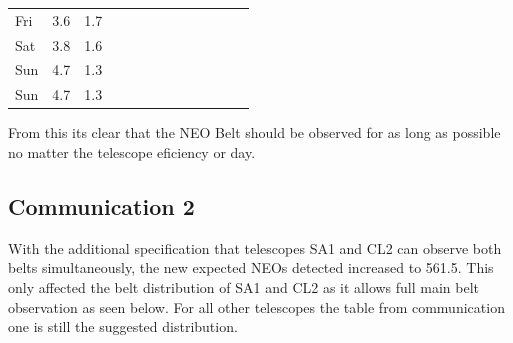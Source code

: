 \documentclass{article}
\begin{document}
\begin{table}[h]
\begin{tabular}{lcccccccccccc}
		{ Fri}                                  & { 3.6}                                  & { 1.7}                                   & { }                         &                                                 & { }                         &                                                 & { }                            &                         & { }                         &                      & { }                         &                      \\
		{ Sat}                                  & { 3.8}                                  & { 1.6}                                   & { }                         &                                                 & { }                         &                                                 & { }                            &                         & { }                         &                      & { }                         &                      \\
		{ Sun}                                  & { 4.7}                                  & { 1.3}                                   & { }                         &                                                 & { }                         &                                                 & { }                            &                         & { }                         &                      & { }                         &                      \\
		Sun                                                         & 4.7                                                         & 1.3                                                          & { }                         &                                                 & { }                         &                                                 & { }                            &                         & { }                         &                      & { }                         &                     
	\end{tabular}
\end{table}

From this its clear that the NEO Belt should be observed for as long as possible no matter the telescope eficiency or day.

\subsection*{Communication 2}
With the additional specification that telescopes SA1 and CL2 can observe both belts simultaneously, the new expected NEOs detected increased to 561.5.
This only affected the belt distribution of SA1 and CL2 as it allows full main belt observation as seen below. For all other telescopes the table from communication one is still the suggested distribution.
\end{document}
